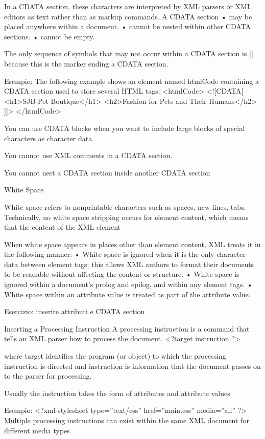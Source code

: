 In a
CDATA section, these characters are interpreted by XML parsers or XML editors as text
rather than as markup commands. A CDATA section
• may be placed anywhere within a document.
• cannot be nested within other CDATA sections.
• cannot be empty.

The only sequence of symbols that may not occur within a CDATA section is ]]
because this is the marker ending a CDATA section.

Esempio:
The following example shows an element named htmlCode containing a CDATA
section used to store several HTML tags:
<htmlCode>
<![CDATA[
		<h1>SJB Pet Boutique</h1>
		<h2>Fashion for Pets and Their Humans</h2>
	]]>
</htmlCode>

You can use CDATA blocks when you want to include large blocks of special
characters as character data

You cannot use XML comments in a CDATA section.

You cannot nest a CDATA section inside another CDATA section

White Space

White space refers to nonprintable characters such as spaces, new lines, tabs.
Technically, no white space ­stripping
occurs for element content, which means that the content of the XML element

When white space appears in places other than element content, XML treats it in the
following manner:
• White space is ignored when it is the only character data between element tags; this
allows XML authors to format their documents to be readable without affecting the
content or structure.
• White space is ignored within a document’s prolog and epilog, and within any
element tags.
• White space within an attribute value is treated as part of the attribute value.

Esercizio:
inserire attributi e CDATA section


Inserting a Processing Instruction
A processing instruction is a command that tells an XML parser how to process the
document.
<?target instruction ?>

where target identifies the program (or object) to which the processing instruction is
directed and instruction is information that the document passes on to the parser for
processing.

Usually the instruction takes the form of attributes and attribute values

Esempio:
<?xml-stylesheet type=”text/css” href=”main.css” media=”all” ?>
Multiple processing instructions can exist within the same XML document for different
media types

